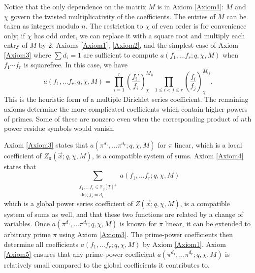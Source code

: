 \documentclass[11pt,letterpaper]{article}
\theoremstyle{definition}
\theoremstyle{remark}
\numberwithin{equation}{section}
\theoremstyle{dotless}
\newcommand{\F}{\mathbb{F}}
\newcommand{\res}[2]{\left(\frac{#1}{#2}\right)}
\begin{document}
Notice that the only dependence on the matrix $M$ is in Axiom \ref{Axiom1}: $M$ and $\chi$ govern the twisted multiplicativity of the coefficients. The entries of $M$ can be taken as integers modulo $n$. The restriction to $\chi$ of even order is for convenience only; if $\chi$ has odd order, we can replace it with a square root and multiply each entry of $M$ by 2. Axioms \ref{Axiom1}, \ref{Axiom2}, and the simplest case of Axiom \ref{Axiom3} where $\sum d_i = 1$ are sufficient to compute $a(f_1, \ldots f_r; q, \chi, M)$ when $f_1\cdots f_r$ is squarefree. In this case, we have 
\begin{equation} \label{SquarefreeCoefficients}
a(f_1, \ldots f_r; q, \chi, M) = \prod_{i=1}^{r} \res{f_i'}{f_i}_{\chi}^{M_{ii}} \prod_{1\leq i<j \leq r} \res{f_i}{f_j}_{\chi}^{M_{ij}}.
\end{equation}
This is the heuristic form of a multiple Dirichlet series coefficient. The remaining axioms determine the more complicated coefficients which contain higher powers of primes. Some of these are nonzero even when the corresponding product of $n$th power residue symbols would vanish. 

Axiom \ref{Axiom3} states that $a(\pi^{d_1}, \ldots \pi^{d_r}; q, \chi, M)$ for $\pi$ linear, which is a local coefficient of $Z_\pi(\vec{x}; q, \chi, M)$, is a compatible system of sums. Axiom \ref{Axiom4} states that 
\begin{equation*}
\sum\limits_{\substack{f_1, \ldots f_r \in \F_q[T]^+ \\ \deg f_i = d_i}} a(f_1, \ldots f_r; q, \chi, M)
\end{equation*} 
which is a global power series coefficient of $Z(\vec{x}; q, \chi, M)$, is a compatible system of sums as well, and that these two functions are related by a change of variables. Once $a(\pi^{d_1}, \ldots \pi^{d_r}; q, \chi, M)$ is known for $\pi$ linear, it can be extended to arbitrary prime $\pi$ using Axiom \ref{Axiom3}. The prime-power coefficients then determine all coefficients $a(f_1, \ldots f_r; q, \chi, M)$ by Axiom \ref{Axiom1}. Axiom \ref{Axiom5} ensures that any prime-power coefficient $a(\pi^{d_1}, \ldots \pi^{d_r}; q, \chi, M)$ is relatively small compared to the global coefficients it contributes to. 
\end{document}
